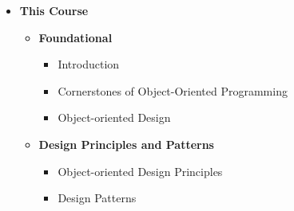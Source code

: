 \begin{center}
\end{center}

\vspace{0.3cm}
\begin{itemize}
    \item \textbf{This Course}
    \begin{itemize}
        \item \textbf{Foundational}
        \begin{itemize}
            \item Introduction
            \item Cornerstones of Object-Oriented Programming
            \item Object-oriented Design
        \end{itemize}
        
        \item \textbf{Design Principles and Patterns}
        \begin{itemize}
            \item Object-oriented Design Principles
            \item Design Patterns
        \end{itemize}
        

\end{itemize}
\end{itemize}
